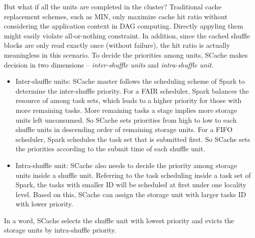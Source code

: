 But what if all the units are completed in the cluster? Traditional cache replacement schemes, such as MIN\cite{min}, only maximize cache hit ratio without considering the application context in DAG computing. 
Directly appyling them might easily violate all-or-nothing constraint.
In addition, since the cached shuffle blocks are only read exactly once (without failure), the hit ratio is actually meaningless in this scenario.
To decide the priorities among units, SCache makes decision in two dimensions -- \textit{inter-shuffle units} and \textit{intra-shuffle unit}. 
\begin{itemize}[noitemsep]
	\item Inter-shuffle units: SCache master follows the scheduling scheme of Spark to determine the inter-shuffle priority. For a FAIR scheduler, Spark balances the resource of among task sets, which leads to a higher priority for those with more remaining tasks. More remaining tasks a stage implies more storage units left unconsumed. So SCache sets priorities from high to low to each shuffle units in descending order of remaining storage units. For a FIFO scheduler, Spark schedules the task set that is submitted first. So SCache sets the priorities according to the submit time of each shuffle unit.
	\item Intra-shuffle unit: SCache also needs to decide the priority among storage units inside a shuffle unit. Referring to the task scheduling inside a task set of Spark, the tasks with smaller ID will be scheduled at first under one locality level. Based on this, SCache can assign the storage unit with larger tasks ID with lower priority.
\end{itemize}
In a word, SCache selects the shuffle unit with lowest priority and evicts the storage units by intra-shuffle priority.



